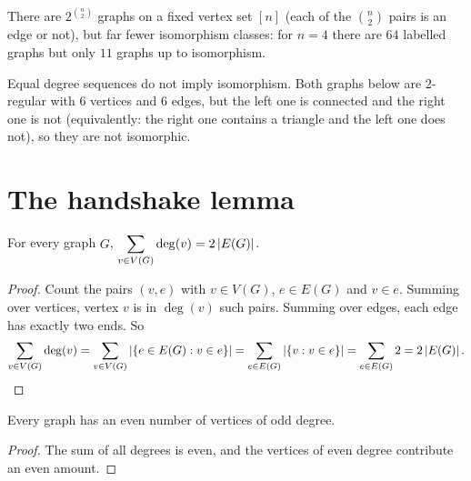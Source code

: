 \begin{aside}
There are $2^{\binom{n}{2}}$ graphs on a fixed vertex set $[n]$ (each of the $\binom n2$ pairs
is an edge or not), but far fewer isomorphism classes: for $n=4$ there are $64$ labelled graphs
but only $11$ graphs up to isomorphism.
\end{aside}

\begin{example}
Equal degree sequences do not imply isomorphism. Both graphs below are $2$-regular with $6$
vertices and $6$ edges, but the left one is connected and the right one is not (equivalently:
the right one contains a triangle and the left one does not), so they are not isomorphic.
\begin{center}
\end{center}
\end{example}

\section{The handshake lemma}

\begin{theorem}
For every graph $G$, $\displaystyle\sum_{v \in V(G)}\deg(v) = 2\left\lvert E(G) \right\rvert$.
\end{theorem}
\begin{proof}
Count the pairs $(v, e)$ with $v \in V(G)$, $e \in E(G)$ and $v \in e$. Summing over vertices,
vertex $v$ is in $\deg(v)$ such pairs. Summing over edges, each edge has exactly two ends. So
\[
\sum_{v\in V(G)}\deg(v) = \sum_{v \in V(G)}\left\lvert \{e\in E(G) : v \in e\} \right\rvert
= \sum_{e\in E(G)}\left\lvert \{v : v\in e\} \right\rvert = \sum_{e \in E(G)} 2 = 2\left\lvert E(G) \right\rvert.
\]
\end{proof}

\begin{corollary}
Every graph has an even number of vertices of odd degree.
\end{corollary}
\begin{proof}
The sum of all degrees is even, and the vertices of even degree contribute an even amount.
\end{proof}

